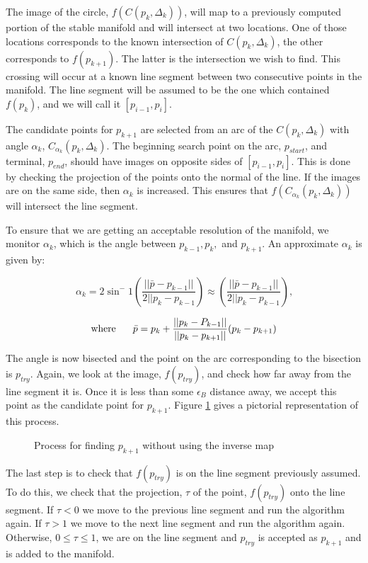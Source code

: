 \documentclass[12pt]{article}
\begin{document}
	The image of the circle, $f(C(p_k, \Delta_k))$, will map to a previously computed portion of the stable manifold and will intersect at two locations. One of those locations corresponds to the known intersection of $C(p_k,\Delta_k)$, the other corresponds to $f(p_{k+1})$. The latter is the intersection we wish to find. This crossing will occur at a known line segment between two consecutive points in the manifold. The line segment will be assumed to be the one which contained $f(p_k)$, and we will call it $[p_{i-1}, p_i]$.
	
	The candidate points for $p_{k+1}$ are selected from an arc of the $C(p_k,\Delta_k)$ with angle $\alpha_k$, $C_{\alpha_k}(p_k,\Delta_k)$.  The beginning search point on the arc, $p_{start}$, and terminal, $p_{end}$, should have images on opposite sides of $[p_{i-1}, p_i]$. This is done by checking the projection of the points onto the normal of the line. If the images are on the same side, then $\alpha_k$ is increased. This ensures that $f(C_{\alpha_k}(p_k, \Delta_k))$ will intersect the line segment.
	
	To ensure that we are getting an acceptable resolution of the manifold, we monitor $\alpha_k$, which is the angle between $p_{k-1}, p_k,$ and $p_{k+1}$. An approximate $\alpha_k$ is given by:
	
	$$\alpha_k = 2\sin^-1\left( \frac {|| \bar{p} -p_{k-1}||}{2||p_k-p_{k-1}}\right) \approx \left( \frac {|| \bar{p} -p_{k-1}||}{2||p_k-p_{k-1}}\right)\text{,} $$
	
	$$\text{where \hspace{5mm}}\bar{p} = p_k+\frac{||p_k -P_{k-1}||}{||p_k-p_{k+1}||} (p_k-p_{k+1})$$
	
	The angle is now bisected and the point on the arc corresponding to the bisection is $p_{try}$. Again, we look at the image, $f(p_{try})$, and check how far away from the line segment it is. Once it is less than some $\epsilon_B$ distance away, we accept this point as the candidate point for $p_{k+1}$. Figure \ref{figure:ninverse} gives a pictorial representation of this process.\\
	\begin{figure}[H]
	\caption{Process for finding $p_{k+1}$ without using the inverse map}
	\label{figure:ninverse}
    \end{figure}
	The last step is to check that $f(p_{try})$ is on the line segment previously assumed. To do this, we check that the projection, $\tau$ of the point, $f(p_{try})$ onto the line segment. If $\tau<0$ we move to the previous line segment and run the algorithm again. If $\tau>1$ we move to the next line segment and run the algorithm again. Otherwise, $0\leq \tau \leq 1$, we are on the line segment and $p_{try}$ is accepted as $p_{k+1}$ and is added to the manifold. 
\end{document}

